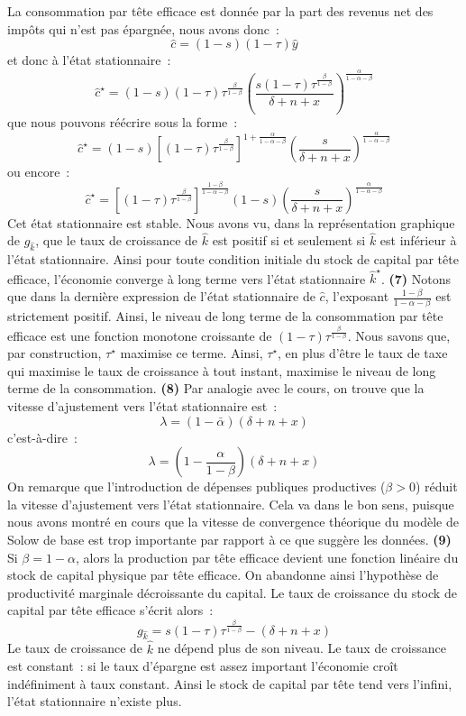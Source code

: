 \documentclass[10pt,a4paper,notitlepage]{article}
\newcommand{\question}[1]{\textbf{(#1)}}
\begin{document}
La consommation par tête efficace est donnée par la part des revenus net des impôts qui n'est pas épargnée, nous avons donc :
\[
\hat c = (1-s)(1-\tau)\hat y
\]
et donc à l'état stationnaire :
\[
\hat{c}^{\star} = (1-s)(1-\tau)\tau^{\frac{\beta}{1-\beta}}\left(\frac{s(1-\tau)\tau^{\frac{\beta}{1-\beta}}}{\delta+n+x}\right)^{\frac{\alpha}{1-\alpha-\beta}}
\]
que nous pouvons réécrire sous la forme :
\[
\hat{c}^{\star} = (1-s)\left[(1-\tau)\tau^{\frac{\beta}{1-\beta}}\right]^{1+\frac{\alpha}{1-\alpha-\beta}}\left(\frac{s}{\delta+n+x}\right)^{\frac{\alpha}{1-\alpha-\beta}}
\]
ou encore :
\[
\hat{c}^{\star} = \left[(1-\tau)\tau^{\frac{\beta}{1-\beta}}\right]^{\frac{1-\beta}{1-\alpha-\beta}}(1-s)\left(\frac{s}{\delta+n+x}\right)^{\frac{\alpha}{1-\alpha-\beta}}
\]
Cet  état   stationnaire  est   stable.   Nous   avons  vu,   dans  la
représentation graphique de $g_{\hat k}$, que le taux de croissance de
$\hat  k$ est  positif si  et seulement  si $\hat  k$ est  inférieur à
l'état stationnaire. Ainsi  pour toute condition initiale  du stock de
capital  par tête  efficace,  l'économie converge  à  long terme  vers
l'état stationnaire $\hat k^{\star}$.  \question{7} Notons que dans la
dernière  expression de  l'état stationnaire  de $\hat  c$, l'exposant
$\frac{1-\beta}{1-\alpha-\beta}$  est strictement  positif. Ainsi,  le
niveau de  long terme  de la  consommation par  tête efficace  est une
fonction              monotone              croissante              de
$(1-\tau)\tau^{\frac{\beta}{1-\beta}}$.    Nous    savons   que,   par
construction, $\tau^{\star}$ maximise ce terme. Ainsi, $\tau^{\star}$,
en plus d'être  le taux de taxe  qui maximise le taux  de croissance à
tout   instant,   maximise   le   niveau   de   long   terme   de   la
consommation. \question{8} Par  analogie avec le cours,  on trouve que
la vitesse d'ajustement vers l'état stationnaire est :
\[
\lambda = (1-\bar \alpha)(\delta+n+x)
\]
c'est-à-dire :
\[
\lambda = \left(1-\frac{\alpha}{1-\beta}\right)(\delta+n+x)
\]
On  remarque  que  l'introduction de  dépenses  publiques  productives
($\beta>0$)    réduit   la    vitesse    d'ajustement   vers    l'état
stationnaire. Cela va  dans le bon sens, puisque nous  avons montré en
cours que  la vitesse de convergence  théorique du modèle de  Solow de
base  est   trop  importante  par   rapport  à  ce  que   suggère  les
données. \question{9} Si  $\beta = 1-\alpha$, alors  la production par
tête  efficace  devient une  fonction  linéaire  du stock  de  capital
physique  par  tête  efficace.   On  abandonne  ainsi  l'hypothèse  de
productivité marginale décroissante du  capital. Le taux de croissance
du stock de capital par tête efficace s'écrit alors :
\[
g_{\hat k} = s(1-\tau)\tau^{\frac{\beta}{1-\beta}} - (\delta+n+x)
\]
Le taux  de croissance de  $\hat k$ ne dépend  plus de son  niveau. Le
taux  de croissance  est constant :  si  le taux  d'épargne est  assez
important  l'économie croît  indéfiniment  à taux  constant. Ainsi  le
stock  de capital  par tête  tend vers  l'infini, l'état  stationnaire
n'existe plus.
\end{document}
